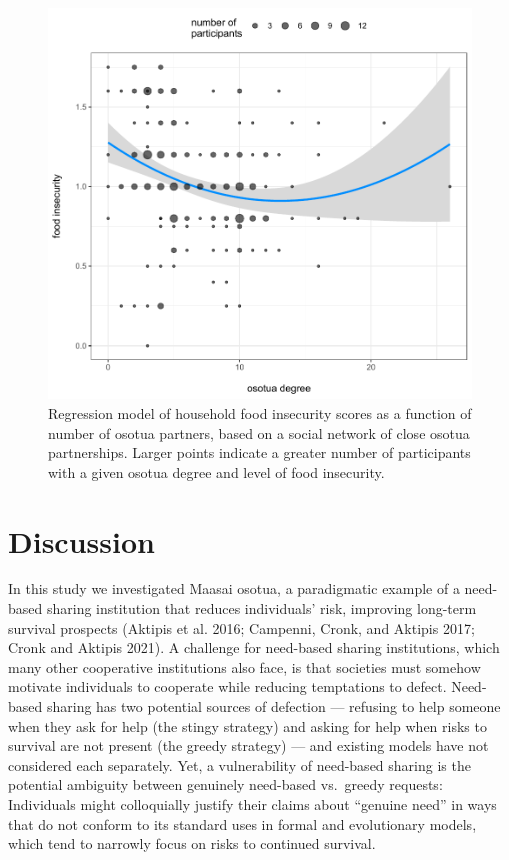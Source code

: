 \documentclass[
]{article}
\begin{document}
\begin{figure}
\centering
\includegraphics{needBasedSharing-paper_files/figure-latex/osotuainsecure-1.pdf}
\caption{\label{fig:osotuainsecure}Regression model of household food insecurity scores as a function of number of osotua partners, based on a social network of close osotua partnerships. Larger points indicate a greater number of participants with a given osotua degree and level of food insecurity.}
\end{figure}

\section{Discussion}\label{discussion}

In this study we investigated Maasai osotua, a paradigmatic example of a need-based sharing institution that reduces individuals' risk, improving long-term survival prospects (Aktipis et al. 2016; Campenni, Cronk, and Aktipis 2017; Cronk and Aktipis 2021). A challenge for need-based sharing institutions, which many other cooperative institutions also face, is that societies must somehow motivate individuals to cooperate while reducing temptations to defect. Need-based sharing has two potential sources of defection --- refusing to help someone when they ask for help (the stingy strategy) and asking for help when risks to survival are not present (the greedy strategy) --- and existing models have not considered each separately. Yet, a vulnerability of need-based sharing is the potential ambiguity between genuinely need-based vs.~greedy requests: Individuals might colloquially justify their claims about ``genuine need'' in ways that do not conform to its standard uses in formal and evolutionary models, which tend to narrowly focus on risks to continued survival.
\end{document}
